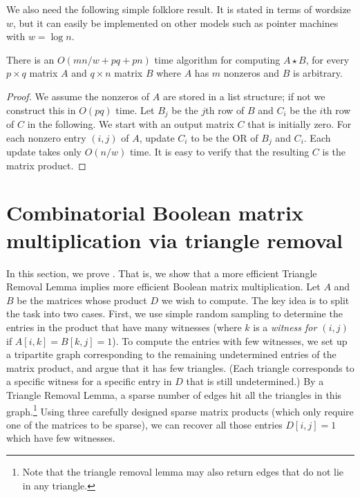 We also need the following simple folklore result. It is stated in terms of wordsize $w$, but it can easily be implemented on other models such as pointer machines with $w=\log n$.

\begin{lemma}[Folklore]\label{sparseword} There is an $O(m n/w + pq + pn)$ time algorithm for computing $A \star B$, for every $p \times q$ matrix $A$ and $q \times n$  matrix $B$ where $A$ has $m$ nonzeros and $B$ is arbitrary.\end{lemma}

\begin{proof} We assume the nonzeros of $A$ are stored in a list structure; if not we construct this in $O(pq)$ time. Let $B_j$ be the $j$th row of $B$ and $C_i$ be the $i$th row of $C$ in the following. We start with an output matrix $C$ that is initially zero. For each nonzero entry $(i,j)$ of $A$, update $C_i$ to be the OR of $B_j$ and $C_i$. Each update takes only $O(n/w)$ time. It is easy to verify that the resulting $C$ is the matrix product.\end{proof}

\section{Combinatorial Boolean matrix multiplication via triangle removal}

In this section, we prove .
That is, we show that a more efficient Triangle Removal Lemma implies more efficient Boolean matrix multiplication.
Let $A$ and $B$ be the matrices whose product $D$ we wish to compute. The key idea is to split the task into two cases. First, we use simple random sampling to determine the entries in the product that have many witnesses (where $k$ is a \emph{witness for $(i,j)$} if $A[i,k]=B[k,j]=1$). To compute the entries with few witnesses, we set up a tripartite graph corresponding to the remaining undetermined entries of the matrix product, and argue that it has few triangles. (Each triangle corresponds to a specific witness for a specific entry in $D$ that is still undetermined.) By a Triangle Removal Lemma, a sparse number of edges hit all the triangles in this graph.\footnote{Note that the triangle removal lemma may also return edges that do not lie in any triangle.} Using three carefully designed sparse matrix products (which only require one of the matrices to be sparse), we can recover all those entries $D[i,j]=1$ which have few witnesses.

